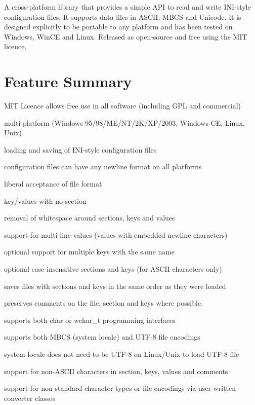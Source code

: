 A cross-\/platform library that provides a simple A\+P\+I to read and write I\+N\+I-\/style configuration files. It supports data files in A\+S\+C\+I\+I, M\+B\+C\+S and Unicode. It is designed explicitly to be portable to any platform and has been tested on Windows, Win\+C\+E and Linux. Released as open-\/source and free using the M\+I\+T licence.

\section*{Feature Summary}


\begin{DoxyItemize}
\item M\+I\+T Licence allows free use in all software (including G\+P\+L and commercial)
\item multi-\/platform (Windows 95/98/\+M\+E/\+N\+T/2\+K/\+X\+P/2003, Windows C\+E, Linux, Unix)
\item loading and saving of I\+N\+I-\/style configuration files
\item configuration files can have any newline format on all platforms
\item liberal acceptance of file format
\begin{DoxyItemize}
\item key/values with no section
\item removal of whitespace around sections, keys and values
\end{DoxyItemize}
\item support for multi-\/line values (values with embedded newline characters)
\item optional support for multiple keys with the same name
\item optional case-\/insensitive sections and keys (for A\+S\+C\+I\+I characters only)
\item saves files with sections and keys in the same order as they were loaded
\item preserves comments on the file, section and keys where possible.
\item supports both char or wchar\+\_\+t programming interfaces
\item supports both M\+B\+C\+S (system locale) and U\+T\+F-\/8 file encodings
\item system locale does not need to be U\+T\+F-\/8 on Linux/\+Unix to load U\+T\+F-\/8 file
\item support for non-\/\+A\+S\+C\+I\+I characters in section, keys, values and comments
\item support for non-\/standard character types or file encodings via user-\/written converter classes

\end{DoxyItemize}
